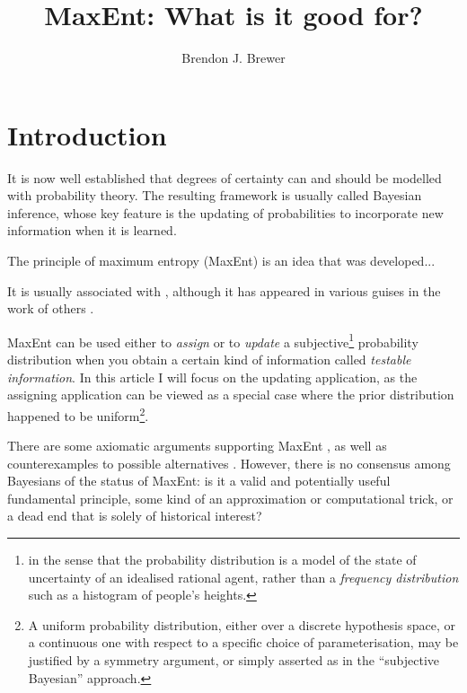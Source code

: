 \documentclass[a4paper, 11pt]{article}
\title{MaxEnt: What is it good for?}
\author{Brendon J. Brewer}
\begin{document}
\maketitle


\section{Introduction}
It is now well established that degrees of certainty can and should be modelled
with probability theory. The resulting framework is usually called Bayesian
inference, whose key feature is the updating of probabilities to incorporate
new information when it is learned.

The principle of maximum entropy (MaxEnt) is an idea that was developed...



It is usually associated with \citet{jaynes}, although it has appeared in
various guises in the work of others \citep[e.g.][]{gibbs, boltzmann, shannon}.

MaxEnt can be used either to {\it assign} or to {\it update} a
subjective\footnote{in the sense that the probability distribution is a model
of the state of uncertainty of an idealised rational agent, rather than
a {\it frequency distribution} such as a histogram of people's heights.}
probability distribution when you obtain a certain kind of information
called {\it testable information}. In this article I will focus on the
updating application, as the assigning application can be viewed as a special
case where the prior distribution happened to be
uniform\footnote{A uniform probability distribution, either over a discrete
hypothesis space, or a continuous one with respect to a specific choice of
parameterisation, may be justified by a symmetry argument, or simply asserted
as in the ``subjective Bayesian'' approach.}.

There are some axiomatic arguments supporting MaxEnt
\citep[e.g.][]{shore_johnson, 2006AIPC..872...31C, 2010arXiv1008.4831K},
as well as counterexamples to possible alternatives \citep[e.g.][]{presse}.
However, there is no consensus among Bayesians of the status of MaxEnt: is
it a valid and potentially useful fundamental principle, some kind of an
approximation or computational trick, or a dead end that is solely of
historical interest?
\end{document}
